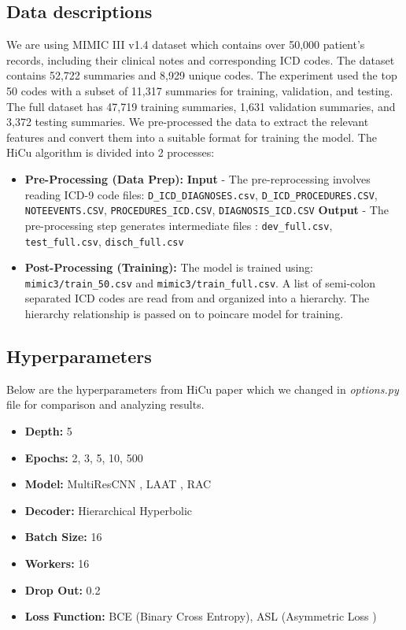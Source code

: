 \documentclass[11pt,a4paper]{article}
\begin{document}
\subsection{Data descriptions}
We are using MIMIC III v1.4 dataset which contains over 50,000 patient's records, including their clinical notes and corresponding ICD codes. The dataset contains 52,722 summaries and 8,929 unique codes. The experiment used the top 50 codes with a subset of 11,317 summaries for training, validation, and testing. The full dataset has 47,719 training summaries, 1,631 validation summaries, and 3,372 testing summaries. We pre-processed the data to extract the relevant features and convert them into a suitable format for training the model. The HiCu algorithm is divided into 2 processes:
\begin{itemize}
    \item \textbf{Pre-Processing (Data Prep):}
        \newline \textbf{Input} - The pre-reprocessing involves reading ICD-9 code files: \newline \texttt{D\_ICD\_DIAGNOSES.csv}, \texttt{D\_ICD\_PROCEDURES.CSV}, \texttt{NOTEEVENTS.CSV}, \texttt{PROCEDURES\_ICD.CSV}, \texttt{DIAGNOSIS\_ICD.CSV} 
        \newline \textbf{Output} - The pre-processing step generates intermediate files : \newline \texttt{dev\_full.csv}, \newline \texttt{test\_full.csv}, \newline \texttt{disch\_full.csv}
    \item \textbf{Post-Processing (Training):}
        The model is trained using: \texttt{mimic3/train\_50.csv} and \texttt{mimic3/train\_full.csv}. \newline \newline A list of semi-colon separated ICD codes are read from and organized into a hierarchy. The hierarchy relationship is passed on to poincare model for training.
\end{itemize}

\subsection{Hyperparameters}
Below are the hyperparameters from HiCu paper which we changed in \textit{options.py} file for comparison and analyzing results.
\begin{itemize}
    \item \textbf{Depth:} 5
    \item \textbf{Epochs:} 2, 3, 5, 10, 500
    \item \textbf{Model:} MultiResCNN \cite{li2020icd}, LAAT \cite{vu2020label}, RAC \cite{kim2021read}
    \item \textbf{Decoder:} Hierarchical Hyperbolic
    \item \textbf{Batch Size:} 16
    \item \textbf{Workers:} 16
    \item \textbf{Drop Out:} 0.2
    \item \textbf{Loss Function:} BCE (Binary Cross Entropy), ASL (Asymmetric Loss \cite{ben2020asymmetric})
\end{itemize}
\end{document}
